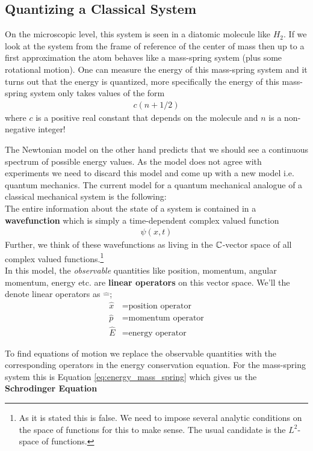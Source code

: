 \subsection{Quantizing a Classical System}
On the microscopic level, this system is seen in a diatomic molecule like $H_2$. If we look at the system from the frame of reference of the center of mass then up to a first approximation the atom behaves like a mass-spring system (plus some rotational motion). One can measure the energy of this mass-spring system and it turns out that the energy is quantized, more specifically the energy of this mass-spring system only takes values of the form
\begin{align*}
	c(n + 1/2)
\end{align*}
where $c$ is a positive real constant that depends on the molecule and $n$ is a non-negative integer!

The Newtonian model on the other hand predicts that we should see a continuous spectrum of possible energy values. As the model does not agree with experiments we need to discard this model and come up with a new model i.e. quantum mechanics. The current model for a quantum mechanical analogue of a classical mechanical system is the following:\\

The entire information about the state of a system is contained in a \textbf{wavefunction} which is simply a time-dependent complex valued function
\begin{align*}
	\psi (x, t)
\end{align*}
Further, we think of these wavefunctions as living in the $\mathbb{C}$-vector space of all complex valued functions.\footnote{As it is stated this is false. We need to impose several analytic conditions on the space of functions for this to make sense. The usual candidate is the $L^2$-space of functions.}\\

In this model, the \emph{observable} quantities like position, momentum, angular momentum, energy etc. are \textbf{linear operators} on this vector space. We'll the denote linear operators as $\hat{-}$;
\begin{align*}
	 \hat{x} &= \mbox{position operator}\\
 \hat{p} &= \mbox{momentum operator}  \\
\hat{E} &= \mbox{energy operator}
\end{align*}

To find equations of motion we replace the observable quantities with the corresponding operators in the energy conservation equation. For the mass-spring system this is Equation \ref{eq:energy_mass_spring} which gives us the \textbf{Schrodinger Equation}

